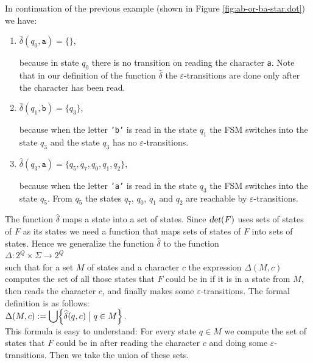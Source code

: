 \exampleEng
In continuation of the previous example (shown in Figure \ref{fig:ab-or-ba-star.dot}) we have:
\begin{enumerate}
\item $\widehat{\delta}(q_0, \texttt{a}) = \{\}$,
  
      because in state $q_0$ there is no transition on reading the character \texttt{a}.
      Note that in our definition of the function  $\widehat{\delta}$ the 
      $\varepsilon$-transitions are done only after the character has been read.
\item $\widehat{\delta}(q_1, \texttt{b}) = \{q_3\}$,

      because when the letter \texttt{'b'} is read in the state $q_1$ the \textsc{FSM}
      switches into the state $q_3$ and the state $q_3$ has no  $\varepsilon$-transitions.
\item $\widehat{\delta}(q_3, \texttt{a}) = \{q_5, q_7, q_0, q_1, q_2\}$,

      because when the letter \texttt{'a'} is read in the state $q_3$ the \textsc{FSM}
      switches into the state $q_5$.  From $q_5$ the states $q_7$, $q_0$, $q_1$ and $q_2$
      are reachable by $\varepsilon$-transitions. \eox
\end{enumerate}
The function  $\widehat{\delta}$ maps a state into a set of states.  Since  $\textsl{det}(F)$ uses
sets of states of $F$ as its states we need a function that maps sets of states of $F$ into sets of states.
Hence we generalize the function $\widehat{\delta}$ to the function
\\[0.2cm]
\hspace*{1.3cm}
$\Delta: 2^Q \times \Sigma \rightarrow 2^Q$
\\[0.2cm]
such that for a set $M$ of states and a character $c$ the expression $\Delta(M, c)$
computes the set of all those states that $F$ could be in if it is in a state from $M$, then
reads the character $c$, and finally makes some $\varepsilon$-transitions.
The formal definition is as follows: 
\\[0.2cm]
\hspace*{1.3cm}
$\displaystyle \Delta(M,c) := \bigcup \Bigl\{ \widehat{\delta}(q,c) \bigm| q \in M \Bigr\}$. 
\\[0.2cm]
This formula is easy to understand:  For every state  $q \in M$ we compute the set of states that 
$F$ could be in after reading the character $c$ and doing some 
$\varepsilon$-transitions.  Then we take the union of these sets.

